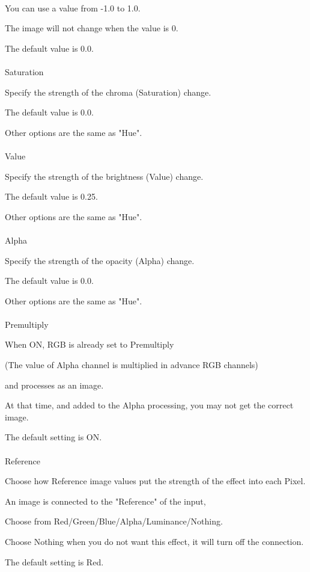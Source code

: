\documentclass[a4paper,12pt]{article}
\begin{document}
\ \vspace{-0.2em}
\par
You can use a value from -1.0 to 1.0.\par
The image will not change when the value is 0.\par
The default value is 0.0.\\
\\
Saturation\par
Specify the strength of the chroma (Saturation) change.\par
The default value is 0.0.\par
Other options are the same as "Hue".\\
\\
Value\par
Specify the strength of the brightness (Value) change.\par
The default value is 0.25.\par
Other options are the same as "Hue".\\
\\
Alpha\par
Specify the strength of the opacity (Alpha) change.\par
The default value is 0.0.\par
Other options are the same as "Hue".\\
\\
Premultiply\par
When ON, RGB is already set to Premultiply\par
(The value of Alpha channel is multiplied in advance RGB channels)\par
and processes as an image.\par
At that time, and added to the Alpha processing, you may not get the correct image.\par
The default setting is ON.\\
\\
Reference\par
Choose how Reference image values put the strength of the effect into each Pixel.\par
An image is connected to the "Reference" of the input,\par
Choose from Red/Green/Blue/Alpha/Luminance/Nothing.\par
Choose Nothing when you do not want this effect, it will turn off the connection.\par
The default setting is Red.
\end{document}
